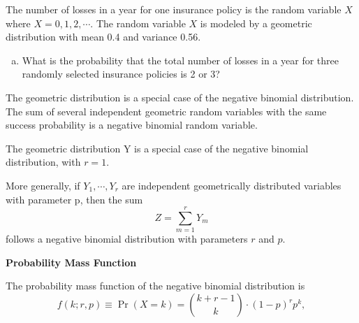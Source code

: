 \documentclass[a4paper,12pt]{article}
\begin{document}
\large



\noindent The number of losses in a year for one insurance policy is the random variable $X$ where $X=0,1,2,\cdots.$ The random variable $X$ is modeled by a geometric distribution with mean 0.4 and variance 0.56.
\begin{enumerate}[(a)]
    \item What is the probability that the total number of losses in a year for three randomly selected insurance policies is 2 or 3?
\end{enumerate}


\medskip
\begin{framed}
\noindent The geometric distribution is a special case of the negative binomial distribution. The sum of several independent geometric random variables with the same success probability is a negative binomial random variable.\\
\medskip


\noindent The geometric distribution Y is a special case of the negative binomial distribution, with $r = 1$. 

\noindent More generally, if $Y_1, \cdots, Y_r$ are independent geometrically distributed variables with parameter p, then the sum
\[ {\displaystyle Z=\sum _{m=1}^{r}Y_{m}}\]
follows a negative binomial distribution with parameters $r$ and $p$.
\end{framed}
\newpage 
\begin{framed}
\noindent \textbf{Probability Mass Function}

\noindent The probability mass function of the negative binomial distribution is
\[
{\displaystyle f(k;r,p)\equiv \Pr(X=k)={k+r-1 \choose k}\cdot (1-p)^{r}p^{k},}\]
\end{framed}
\end{document}
